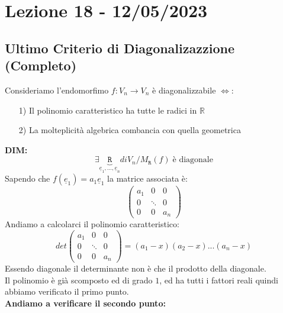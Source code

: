 \section{Lezione 18 - 12/05/2023}

\subsection{Ultimo Criterio di Diagonalizazzione (Completo)}
Consideriamo l'endomorfimo $f: V_n \rightarrow V_n$ è diagonalizzabile $\Leftrightarrow$:
\begin{itemize}
\item[1)]Il polinomio caratteristico ha tutte le radici in $\mathbb{R}$
\item[2)]La molteplicità algebrica combancia con quella geometrica
\end{itemize}
\textbf{DIM:}
$$ 
\exists \underbrace{\mathtt{R}}_{\underline{e}_1,...,\underline{e}_n} di V_n/ M_{\mathtt{R}}(f) \; \text{è diagonale} 
$$
Sapendo che $f(\underline{e}_1) = a_1\underline{e}_1$ la matrice associata è:
$$ 
\begin{pmatrix}
a_1 & 0 & 0\\
0 & \ddots & 0 \\
0 & 0 & a_n
\end{pmatrix}
$$
Andiamo a calcolarci il polinomio caratteristico:
$$ 
det \begin{pmatrix}
a_1 & 0 & 0\\
0 & \ddots & 0 \\
0 & 0 & a_n
\end{pmatrix}
= (a_1-x)(a_2-x)...(a_n-x)
$$
Essendo diagonale il determinante non è che il prodotto della diagonale.\\
Il polinomio è già scomposto ed di grado $1$, ed ha tutti i fattori reali quindi abbiamo verificato il primo punto.\\
\textbf{Andiamo a verificare il secondo punto:}\\


